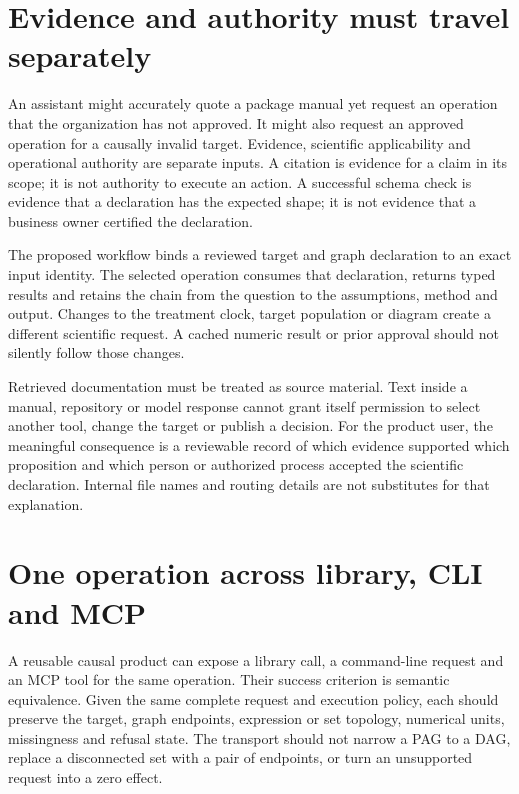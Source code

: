\section{Evidence and authority must travel separately}

An assistant might accurately quote a package manual yet request an operation
that the organization has not approved. It might also request an approved
operation for a causally invalid target. Evidence, scientific applicability
and operational authority are separate inputs. A citation is evidence for a
claim in its scope; it is not authority to execute an action. A successful
schema check is evidence that a declaration has the expected shape; it is not
evidence that a business owner certified the declaration.

The proposed workflow binds a reviewed target and graph declaration to an
exact input identity. The selected operation consumes that declaration,
returns typed results and retains the chain from the question to the
assumptions, method and output. Changes to the treatment clock, target
population or diagram create a different scientific request. A cached
numeric result or prior approval should not silently follow those changes.

Retrieved documentation must be treated as source material. Text inside a
manual, repository or model response cannot grant itself permission to select
another tool, change the target or publish a decision. For the product user,
the meaningful consequence is a reviewable record of which evidence supported
which proposition and which person or authorized process accepted the
scientific declaration. Internal file names and routing details are not
substitutes for that explanation.

\section{One operation across library, CLI and MCP}

A reusable causal product can expose a library call, a command-line request
and an MCP tool for the same operation. Their success criterion is semantic
equivalence. Given the same complete request and execution policy, each should
preserve the target, graph endpoints, expression or set topology, numerical
units, missingness and refusal state. The transport should not narrow a PAG
to a DAG, replace a disconnected set with a pair of endpoints, or turn an
unsupported request into a zero effect.

